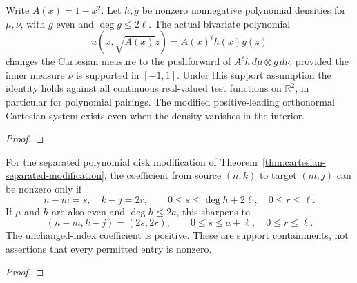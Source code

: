 \begin{theorem}
\label{thm:cartesian-separated-modification}
\leanok
Write $A(x)=1-x^2$. Let $h,g$ be nonzero nonnegative polynomial densities for
$\mu,\nu$, with $g$ even and $\deg g\le2\ell$. The actual bivariate polynomial
\[
 u(x,\sqrt{A(x)}z)=A(x)^\ell h(x)g(z)
\]
changes the Cartesian measure to the pushforward of
$A^\ell h\,d\mu\otimes g\,d\nu$, provided the inner measure $\nu$ is supported
in $[-1,1]$. Under this support assumption the identity holds against all
continuous real-valued test functions on $\mathbb R^2$, in particular for polynomial pairings. The modified
positive-leading orthonormal Cartesian system exists even when the density
vanishes in the interior.
\end{theorem}
\begin{proof}
\leanok
\end{proof}

\begin{theorem}
\label{thm:cartesian-connection-support}
\leanok
For the separated polynomial disk modification of Theorem~\ref{thm:cartesian-separated-modification}, the coefficient from source $(n,k)$ to target
$(m,j)$ can be nonzero only if
\[
 n-m=s,\quad k-j=2r,\qquad
 0\le s\le\deg h+2\ell,\quad 0\le r\le\ell.
\]
If $\mu$ and $h$ are also even and $\deg h\le2a$, this sharpens to
\[
 (n-m,k-j)=(2s,2r),\qquad 0\le s\le a+\ell,\quad 0\le r\le\ell.
\]
The unchanged-index coefficient is positive. These are support containments,
not assertions that every permitted entry is nonzero.
\end{theorem}
\begin{proof}
\leanok
\end{proof}

